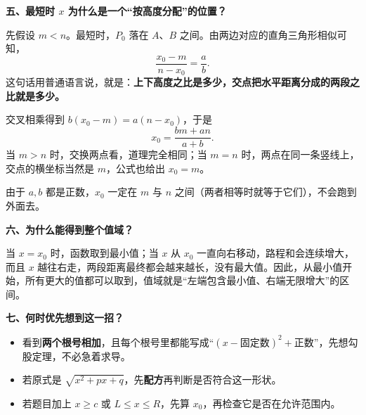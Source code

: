 \clearpage
\begin{explanationbox}
\textbf{\textcolor{CExplanation}{五、最短时 $x$ 为什么是一个“按高度分配”的位置？}}



先假设 $m<n$。最短时，$P_0$ 落在 $A$、$B$ 之间。由两边对应的直角三角形相似可知，
\[
 \frac{x_0-m}{n-x_0}=\frac{a}{b}.
\]
这句话用普通语言说，就是：\textbf{上下高度之比是多少，交点把水平距离分成的两段之比就是多少。}

交叉相乘得到 $b(x_0-m)=a(n-x_0)$，于是
\[
 x_0=\frac{bm+an}{a+b}.
\]
当 $m>n$ 时，交换两点看，道理完全相同；当 $m=n$ 时，两点在同一条竖线上，交点的横坐标当然是 $m$，公式也给出 $x_0=m$。

由于 $a,b$ 都是正数，$x_0$ 一定在 $m$ 与 $n$ 之间（两者相等时就等于它们），不会跑到外面去。

\medskip
\end{explanationbox}
\clearpage
\begin{explanationbox}
\textbf{\textcolor{CExplanation}{六、为什么能得到整个值域？}}

当 $x=x_0$ 时，函数取到最小值；当 $x$ 从 $x_0$ 一直向右移动，路程和会连续增大，而且 $x$ 越往右走，两段距离最终都会越来越长，没有最大值。因此，从最小值开始，所有更大的值都可以取到，值域就是“左端包含最小值、右端无限增大”的区间。

\medskip
\textbf{\textcolor{CExplanation}{七、何时优先想到这一招？}}
\begin{itemize}[leftmargin=*,itemsep=.35em]
\item 看到\textbf{两个根号相加}，且每个根号里都能写成“$(x-\text{固定数})^2+\text{正数}$”，先想勾股定理，不必急着求导。
\item 若原式是 $\sqrt{x^2+px+q}$，先\textbf{配方}再判断是否符合这一形状。
\item 若题目加上 $x\geq c$ 或 $L\leq x\leq R$，先算 $x_0$，再检查它是否在允许范围内。
\end{itemize}
\end{explanationbox}
